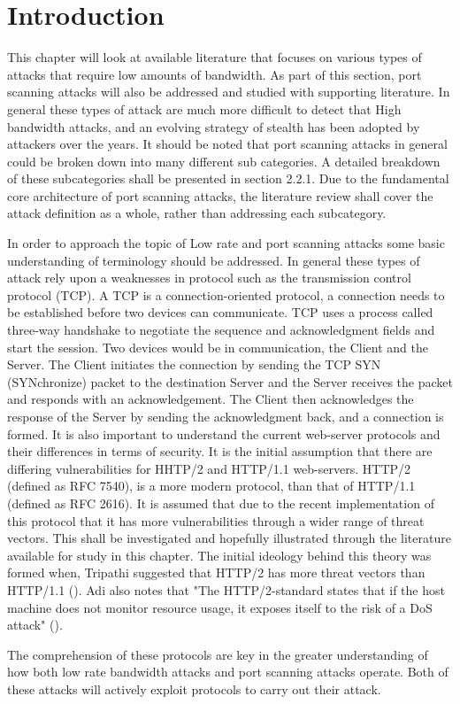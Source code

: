 \section*{Introduction}
This chapter will look at available literature that focuses on various types of attacks that require low amounts of bandwidth. As part of this section, port scanning attacks will also be addressed and studied with supporting literature. In general these types of attack are much more difficult to detect that High bandwidth attacks, and an evolving strategy of stealth has been adopted by attackers over the years. It should be noted that port scanning attacks in general could be broken down into many different sub categories. A detailed breakdown of these subcategories shall be presented in section 2.2.1. Due to the fundamental core architecture of port scanning attacks, the literature review shall cover the attack definition as a whole, rather than addressing each subcategory.

In order to approach the topic of Low rate and port scanning attacks some basic understanding of terminology should be addressed. In general these types of attack rely upon a weaknesses in protocol such as the transmission control protocol (TCP). A TCP is a connection-oriented protocol, a connection needs to be established before two devices can communicate. TCP uses a process called three-way handshake to negotiate the sequence and acknowledgment fields and start the session. Two devices would be in communication, the Client and the Server. The Client initiates the connection by sending the TCP SYN (SYNchronize) packet to the destination Server and the Server receives the packet and responds with an acknowledgement. The Client then acknowledges the response of the Server by sending the acknowledgment back, and a connection is formed. 
It is also important to understand the current web-server protocols and their differences in terms of security. It is the initial assumption that there are differing vulnerabilities for HHTP/2 and HTTP/1.1 web-servers. HTTP/2 (defined as RFC 7540), is a more modern protocol, than that of HTTP/1.1 (defined as RFC 2616). It is assumed that due to the recent implementation of this protocol that it has more vulnerabilities through a wider range of threat vectors. This shall be investigated and hopefully illustrated through the literature available for study in this chapter. The initial ideology behind this theory was formed when, Tripathi suggested that HTTP/2 has more threat vectors than HTTP/1.1 (\cite{tripathi2018slow}). Adi also notes that "The HTTP/2-standard states that if the host machine does not monitor resource usage, it exposes itself to the risk of a DoS attack" (\cite{Adi2015}).

The comprehension of these protocols are key in the greater understanding of how both low rate bandwidth attacks and port scanning attacks operate. Both of these attacks will actively exploit protocols to carry out their attack. 